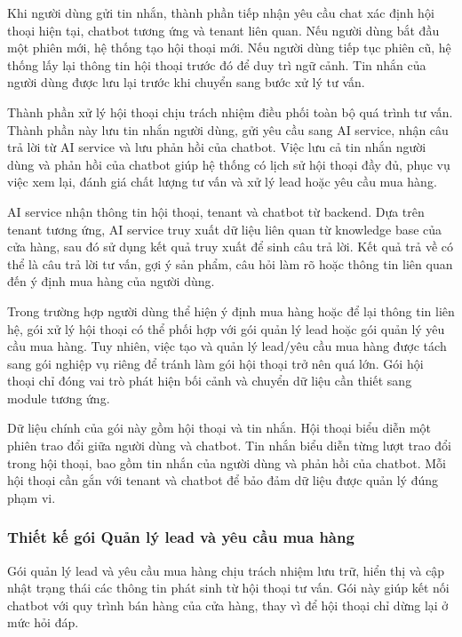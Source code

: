 \documentclass[../DoAn.tex]{subfiles}
\begin{document}
Khi người dùng gửi tin nhắn, thành phần tiếp nhận yêu cầu chat xác định hội thoại hiện tại, chatbot tương ứng và tenant liên quan. Nếu người dùng bắt đầu một phiên mới, hệ thống tạo hội thoại mới. Nếu người dùng tiếp tục phiên cũ, hệ thống lấy lại thông tin hội thoại trước đó để duy trì ngữ cảnh. Tin nhắn của người dùng được lưu lại trước khi chuyển sang bước xử lý tư vấn.

Thành phần xử lý hội thoại chịu trách nhiệm điều phối toàn bộ quá trình tư vấn. Thành phần này lưu tin nhắn người dùng, gửi yêu cầu sang AI service, nhận câu trả lời từ AI service và lưu phản hồi của chatbot. Việc lưu cả tin nhắn người dùng và phản hồi của chatbot giúp hệ thống có lịch sử hội thoại đầy đủ, phục vụ việc xem lại, đánh giá chất lượng tư vấn và xử lý lead hoặc yêu cầu mua hàng.

AI service nhận thông tin hội thoại, tenant và chatbot từ backend. Dựa trên tenant tương ứng, AI service truy xuất dữ liệu liên quan từ knowledge base của cửa hàng, sau đó sử dụng kết quả truy xuất để sinh câu trả lời. Kết quả trả về có thể là câu trả lời tư vấn, gợi ý sản phẩm, câu hỏi làm rõ hoặc thông tin liên quan đến ý định mua hàng của người dùng.

Trong trường hợp người dùng thể hiện ý định mua hàng hoặc để lại thông tin liên hệ, gói xử lý hội thoại có thể phối hợp với gói quản lý lead hoặc gói quản lý yêu cầu mua hàng. Tuy nhiên, việc tạo và quản lý lead/yêu cầu mua hàng được tách sang gói nghiệp vụ riêng để tránh làm gói hội thoại trở nên quá lớn. Gói hội thoại chỉ đóng vai trò phát hiện bối cảnh và chuyển dữ liệu cần thiết sang module tương ứng.

Dữ liệu chính của gói này gồm hội thoại và tin nhắn. Hội thoại biểu diễn một phiên trao đổi giữa người dùng và chatbot. Tin nhắn biểu diễn từng lượt trao đổi trong hội thoại, bao gồm tin nhắn của người dùng và phản hồi của chatbot. Mỗi hội thoại cần gắn với tenant và chatbot để bảo đảm dữ liệu được quản lý đúng phạm vi.

\subsubsection{Thiết kế gói Quản lý lead và yêu cầu mua hàng}

Gói quản lý lead và yêu cầu mua hàng chịu trách nhiệm lưu trữ, hiển thị và cập nhật trạng thái các thông tin phát sinh từ hội thoại tư vấn. Gói này giúp kết nối chatbot với quy trình bán hàng của cửa hàng, thay vì để hội thoại chỉ dừng lại ở mức hỏi đáp.
\end{document}
